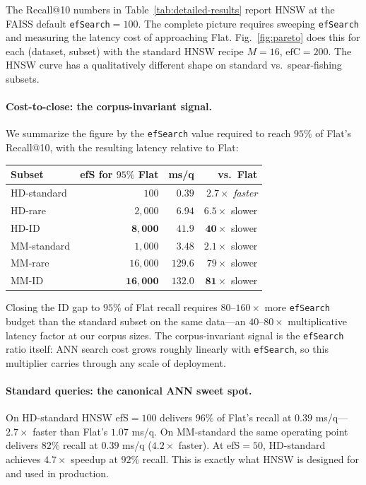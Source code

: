 \documentclass[conference]{IEEEtran}
\begin{document}
The Recall@10 numbers in Table~\ref{tab:detailed-results} report HNSW at the FAISS default \texttt{efSearch}$=100$. The complete picture requires sweeping \texttt{efSearch} and measuring the latency cost of approaching Flat. Fig.~\ref{fig:pareto} does this for each (dataset, subset) with the standard HNSW recipe $M{=}16$, $\mathrm{efC}{=}200$. The HNSW curve has a qualitatively different shape on standard vs.\ spear-fishing subsets.

\paragraph{Cost-to-close: the corpus-invariant signal.}
We summarize the figure by the \texttt{efSearch} value required to reach $95\%$ of Flat's Recall@10, with the resulting latency relative to Flat:
\begin{center}\small
\setlength{\tabcolsep}{4pt}
\begin{tabular}{lrrr}
\toprule
Subset & efS for $95\%$ Flat & ms/q & vs.\ Flat \\
\midrule
HD-standard  & $100$    & $0.39$  & $2.7\times$ \emph{faster} \\
HD-rare      & $2{,}000$ & $6.94$  & $6.5\times$ slower \\
HD-ID        & $\mathbf{8{,}000}$ & $\mathbf{41.9}$ & $\mathbf{40\times}$ slower \\
MM-standard  & $1{,}000$ & $3.48$  & $2.1\times$ slower \\
MM-rare      & $16{,}000$ & $129.6$ & $79\times$ slower \\
MM-ID        & $\mathbf{16{,}000}$ & $\mathbf{132.0}$ & $\mathbf{81\times}$ slower \\
\bottomrule
\end{tabular}
\end{center}
Closing the ID gap to $95\%$ of Flat recall requires $80$--$160\times$ more \texttt{efSearch} budget than the standard subset on the same data---an $40$--$80\times$ multiplicative latency factor at our corpus sizes. The corpus-invariant signal is the \texttt{efSearch} ratio itself: ANN search cost grows roughly linearly with \texttt{efSearch}, so this multiplier carries through any scale of deployment.

\paragraph{Standard queries: the canonical ANN sweet spot.}
On HD-standard HNSW efS$=100$ delivers $96\%$ of Flat's recall at $0.39$ ms/q---$2.7\times$ faster than Flat's $1.07$ ms/q. On MM-standard the same operating point delivers $82\%$ recall at $0.39$ ms/q ($4.2\times$ faster). At efS$=50$, HD-standard achieves $4.7\times$ speedup at $92\%$ recall. This is exactly what HNSW is designed for and used in production.
\end{document}
